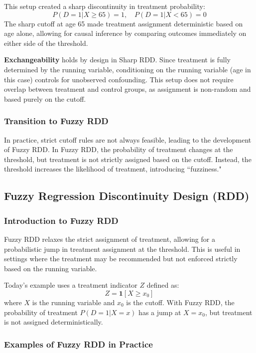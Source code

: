 This setup created a sharp discontinuity in treatment probability:
\[
P(D=1|X \geq 65) = 1, \quad P(D=1|X < 65) = 0
\]
The sharp cutoff at age 65 made treatment assignment deterministic based on age alone, allowing for causal inference by comparing outcomes immediately on either side of the threshold.

\textbf{Exchangeability} holds by design in Sharp RDD. Since treatment is fully determined by the running variable, conditioning on the running variable (age in this case) controls for unobserved confounding. This setup does not require overlap between treatment and control groups, as assignment is non-random and based purely on the cutoff.

\subsubsection{Transition to Fuzzy RDD}

In practice, strict cutoff rules are not always feasible, leading to the development of Fuzzy RDD. In Fuzzy RDD, the probability of treatment changes at the threshold, but treatment is not strictly assigned based on the cutoff. Instead, the threshold increases the likelihood of treatment, introducing ``fuzziness."

\subsection{Fuzzy Regression Discontinuity Design (RDD)}

\subsubsection{Introduction to Fuzzy RDD}

Fuzzy RDD relaxes the strict assignment of treatment, allowing for a probabilistic jump in treatment assignment at the threshold. This is useful in settings where the treatment may be recommended but not enforced strictly based on the running variable.

Today’s example uses a treatment indicator \( Z \) defined as:
\[
Z = \mathbf{1}[X \geq x_0]
\]
where \( X \) is the running variable and \( x_0 \) is the cutoff. With Fuzzy RDD, the probability of treatment \( P(D=1 | X=x) \) has a jump at \( X = x_0 \), but treatment is not assigned deterministically.

\subsubsection{Examples of Fuzzy RDD in Practice}

